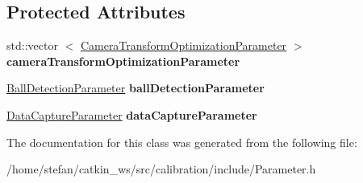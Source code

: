 \subsection*{\-Protected \-Attributes}
\begin{DoxyCompactItemize}
\item 
\hypertarget{classCameraCalibrationOptions_ac4ce9c7aed964e8b7a4d7ed1ffae28ce}{std\-::vector\*
$<$ \hyperlink{classCameraTransformOptimizationParameter}{\-Camera\-Transform\-Optimization\-Parameter} $>$ {\bfseries camera\-Transform\-Optimization\-Parameter}}\label{classCameraCalibrationOptions_ac4ce9c7aed964e8b7a4d7ed1ffae28ce}

\item 
\hypertarget{classCameraCalibrationOptions_a8a4c1bafb4c1d402c0a6770db93f8189}{\hyperlink{classBallDetectionParameter}{\-Ball\-Detection\-Parameter} {\bfseries ball\-Detection\-Parameter}}\label{classCameraCalibrationOptions_a8a4c1bafb4c1d402c0a6770db93f8189}

\item 
\hypertarget{classCameraCalibrationOptions_a2f288866a304a47821e8a6b3af90ab2a}{\hyperlink{classDataCaptureParameter}{\-Data\-Capture\-Parameter} {\bfseries data\-Capture\-Parameter}}\label{classCameraCalibrationOptions_a2f288866a304a47821e8a6b3af90ab2a}

\end{DoxyCompactItemize}


\-The documentation for this class was generated from the following file\-:\begin{DoxyCompactItemize}
\item 
/home/stefan/catkin\-\_\-ws/src/calibration/include/\-Parameter.\-h\end{DoxyCompactItemize}
